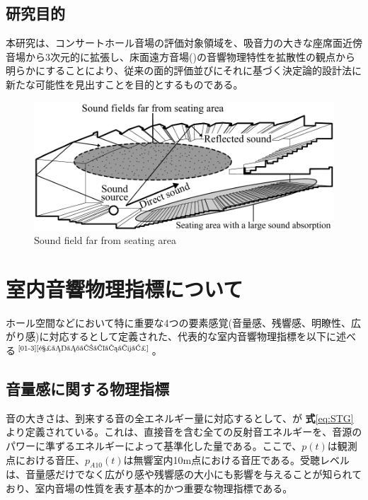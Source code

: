 \subsection{研究目的}
本研究は、コンサートホール音場の評価対象領域を、吸音力の大きな座席面近傍音場から3次元的に拡張し、床面遠方音場()の音響物理特性を拡散性の観点から明らかにすることにより、従来の面的評価並びにそれに基づく決定論的設計法に新たな可能性を見出すことを目的とするものである。
\begin{figure}[htbp]
    \centering
    \includegraphics[keepaspectratio,scale=0.8]{01_att/zasekimen_enpo_English.pdf}
    \caption{\hspace{1mm}Sound field far from seating area}
    \label{fig:座席面遠方音場}
\end{figure}

\newpage
\section{室内音響物理指標について}
ホール空間などにおいて特に重要な4つの要素感覚(音量感、残響感、明瞭性、広がり感)に対応するとして定義された、代表的な室内音響物理指標を以下に述べる$^{\text{\cite{01-3}}{\text{\cite{響きのパラメータ}}}}$。

\subsection{音量感に関する物理指標}
音の大きさは、到来する音の全エネルギー量に対応するとして、\STG が \textbf{式}\ref{eq:STG}より定義されている。これは、直接音を含む全ての反射音エネルギーを、音源のパワーに準ずるエネルギーによって基準化した量である。ここで、$p(t)$は観測点における音圧、$p_{A10}(t)$は無響室内10m点における音圧である。受聴レベルは、音量感だけでなく広がり感や残響感の大小にも影響を与えることが知られており、室内音場の性質を表す基本的かつ重要な物理指標である。

